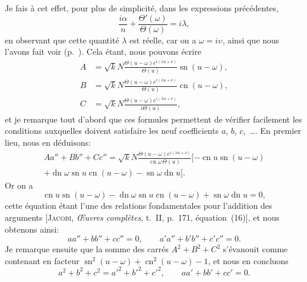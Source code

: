 \documentclass[11pt,leqno,oneside,letterpaper]{book}[2005/09/16]
\DeclareMathOperator{\sn}{sn}
\DeclareMathOperator{\cn}{cn}
\DeclareMathOperator{\dn}{dn}
\begin{document}
Je fais \`a cet effet, pour plus de simplicit\'e, dans les expressions pr\'ec\'ed\-entes,\label{page31}
\[
\frac{i\alpha}{n} + \frac{\Theta'(\omega)}{\Theta(\omega)} = i\lambda,
\]
en observant que cette quantit\'e $\lambda$ est r\'eelle, car on a $\omega=i\upsilon$, ainsi que
nous l'avons fait voir (p.~\pageref{page27a}). Cela \'etant, nous pouvons \'ecrire
\begin{align*}
  A &= \sqrt{k} N \frac{\Theta(u-\omega)
       e^{i(\lambda u+\nu)}}{\Theta(u)} \sn(u-\omega),
\\
  B &= \sqrt{k} N \frac{\Theta(u-\omega)
       e^{i(\lambda u+\nu)}}{\Theta(u)} \cn(u-\omega),
\\
  C &= \sqrt{k} N \frac{\Theta(u-\omega)
       e^{i(\lambda u+\nu)}}{i\Theta(u)} ,
\end{align*}
et je remarque tout d'abord que ces formules permettent de v\'erifier
facilement les conditions auxquelles doivent satisfaire les neuf coefficients
$a$, $b$, $c$,~\ldots. En premier lieu, nous en d\'eduisons:
\begin{multline*}
  Aa'' + Bb'' + Cc''
= \sqrt{k} N \frac{\Theta(u-\omega)e^{i(\lambda u+\nu)}}{\cn\omega\,\Theta(u)}
  [-\cn u \sn(u-\omega)
\\
+ \dn\omega \sn u \cn(u-\omega) - \sn\omega \dn u].
\end{multline*}
Or on a
\[
\cn u \sn(u-\omega)
- \dn\omega \sn u \cn(u-\omega)
+ \sn\omega \dn u = 0,
\]
cette \'equation \'etant l'une des relations fondamentales pour l'addition des
arguments [\textsc{Jacobi}, \textit{{\OE}uvres compl\`etes}, t.~II, p.~171, \'equation~(16)], et nous
obtenons ainsi:
\[
  a a'' + b b'' + c c'' = 0, \qquad
  a'a'' + b'b'' + c'c'' = 0.
\]
Je remarque ensuite que la somme des carr\'es $A^2 + B^2 + C^2$ s'\'evanouit
comme contenant en facteur $\sn^2(u-\omega) + \cn^2(u-\omega) - 1$, et nous en
concluons
\[
  a^2 + b^2 + c^2 = a'^2 + b'^2+ c'^2, \qquad
  aa' + bb' + cc' = 0.
\]
\medskip
\end{document}
